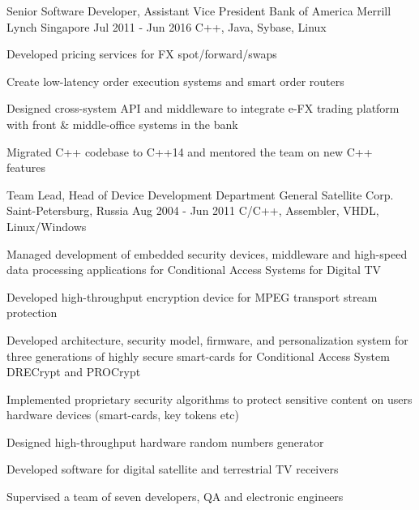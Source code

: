 \begin{cventries}
  \cventry
    {Senior Software Developer, Assistant Vice President} %
    {Bank of America Merrill Lynch} %
    {Singapore} %
    {Jul 2011 - Jun 2016} %
    {C++, Java, Sybase, Linux}
    {
      \begin{cvitems} %
        \item {Developed pricing services for FX spot/forward/swaps}
        \item {Create low-latency order execution systems and smart order routers}
        \item {Designed cross-system API and middleware to integrate e-FX trading platform with front \& middle-office systems in the bank}
        \item {Migrated C++ codebase to C++14 and mentored the team on new C++ features}
      \end{cvitems}
    }

  \cventry
    {Team Lead, Head of Device Development Department} %
    {General Satellite Corp.} %
    {Saint-Petersburg, Russia} %
    {Aug 2004 - Jun 2011} %
    {C/C++, Assembler, VHDL, Linux/Windows}
    {
      \begin{cvitems} %
        \item {Managed development of embedded security devices, middleware and high-speed data processing applications for Conditional Access Systems for Digital TV}
        \item {Developed high-throughput encryption device for MPEG transport stream protection}
        \item {Developed architecture, security model, firmware, and personalization system for three generations of highly secure smart-cards for Conditional Access System DRECrypt and PROCrypt}
        \item {Implemented proprietary security algorithms to protect sensitive content on users hardware devices (smart-cards, key tokens etc)}
        \item {Designed high-throughput hardware random numbers generator}
        \item {Developed software for digital satellite and terrestrial TV receivers}
        \item {Supervised a team of seven developers, QA and electronic engineers}
      \end{cvitems}
    }


\end{cventries}
